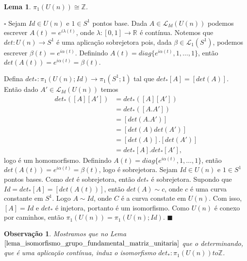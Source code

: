 \documentclass[12pt]{book}
\newtheorem{lema}[teorema]{Lema}
\newtheorem{observacao}[teorema]{Observação}
\newenvironment{prova}[1]{$\square$ #1}{\hfill$\blacksquare$}
\newcommand{\caminhospontobasegeral}[2]{\mathcal{L}_{#1}(#2)}
\newcommand{\circulo}{S^{1}}
\newcommand{\classe}[1]{[#1]}
\newcommand{\grupofundamental}[1]{\pi_{1}(#1)}
\newcommand{\grupofundamentalpontobase}[2]{\pi_{1}(#1; #2)}
\newcommand{\inteiros}{\mathbb{Z}}
\newcommand{\matrizunitaria}[1]{U(#1)}
\newcommand{\real}[1]{\mathbb{R}^{#1}}
\newcommand{\reta}{\real{}}
\begin{document}
	\begin{lema}\label{lema_isomorfismo_grupo_fundamental_matriz_unitaria}
		$\grupofundamental{\matrizunitaria{n}} \cong \inteiros$.
	\end{lema}
	\begin{prova}
		Sejam $Id \in \matrizunitaria{n}$ e $1 \in \circulo$ pontos base. Dada $A\in \caminhospontobasegeral{Id}{\matrizunitaria{n}}$ podemos escrever $A(t) = e^{i\lambda(t)}$,  onde $\lambda:[0,1 ]\to \reta$ é contínua. Notemos que $det:\matrizunitaria{n} \to \circulo$ é uma aplicação sobrejetora pois, dada $\beta \in \caminhospontobasegeral{1}{\circulo}$, podemos escrever $\beta(t) = e^{i\alpha(t)}$. Definindo $A(t) = diag\{e^{i\alpha(t)}, 1, \dots, 1\}$, então $det(A(t)) =e^{i\alpha(t)}=\beta(t)$.
		
		Defina $det_{*}: \grupofundamentalpontobase{\matrizunitaria{n}}{Id} \to \grupofundamentalpontobase{\circulo}{1}$ tal que $det_{*}\classe{A} = \classe{det(A)}$. Então dado $A' \in \caminhospontobasegeral{Id}{\matrizunitaria{n}}$ temos 
		$$
		\begin{aligned}
			det_{*}(\classe{A}\classe{A'}) 
			&= det_{*}(\classe{A}\classe{A'}) 
			\\
			&= det_{*}(\classe{A.A'}) 
			\\
			&=\classe{det(A.A')}
			\\
			&=\classe{det(A)det(A')}
			\\
			&=\classe{det(A)}.\classe{det(A')}
			\\
			&=det_{*}\classe{A}.det_{*}\classe{A'},  
		\end{aligned}
		$$
		logo é um homomorfismo. Definindo $A(t) = diag\{e^{i\alpha(t)}, 1, \dots, 1\}$, então $det(A(t)) = e^{i\alpha(t)} = \beta(t)$, logo é sobrejetora. Sejam $Id \in \matrizunitaria{n}$ e $ 1 \in \circulo$ pontos bases. Como $det$ é sobrejetora, então $det_{*}$ é sobrejetora. Supondo que $Id = det_{*}\classe{A} = \classe{det(A(t))}$, então $det(A) \sim c$, onde $c$ é uma curva constante em $\circulo$. Logo $A \sim Id $, onde $C$ é a curva constate em $\matrizunitaria{n}$. Com isso, $\classe{A} = Id$ e $det_{*}$ é injetora, portanto é um isomorfismo.
		Como $\matrizunitaria{n}$ é conexo por caminhos, então $\grupofundamental{\matrizunitaria{n}} = \grupofundamentalpontobase{\matrizunitaria{n}}{Id}$.
	\end{prova}
	
	\begin{observacao}\label{observacao_determinante_homomorfismo}
		Mostramos que no Lema $\ref{lema_isomorfismo_grupo_fundamental_matriz_unitaria}$ que o determinando, que é uma aplicação contínua, induz o isomorfismo $det_{*}: \grupofundamental{\matrizunitaria{n}} to \inteiros$.
	\end{observacao}
	
\end{document}
